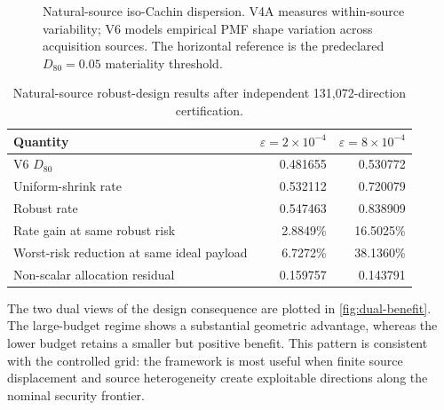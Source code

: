 \documentclass[10pt]{article}
\begin{document}
\begin{figure}[t]
\centering
{}
\caption{Natural-source iso-Cachin dispersion. V4A measures within-source variability; V6 models empirical PMF shape variation across acquisition sources. The horizontal reference is the predeclared \(D_{80}=0.05\) materiality threshold.}
\label{fig:natural-d80}
\end{figure}

\begin{table}[t]
\centering
\caption{Natural-source robust-design results after independent 131,072-direction certification.}
\label{tab:natural-results}
\small
\begin{tabular}{@{}lrr@{}}
\toprule
Quantity & \(\varepsilon=2\times10^{-4}\) & \(\varepsilon=8\times10^{-4}\)\\
\midrule
V6 \(D_{80}\) & 0.481655 & 0.530772\\
Uniform-shrink rate & 0.532112 & 0.720079\\
Robust rate & 0.547463 & 0.838909\\
Rate gain at same robust risk & 2.8849\% & 16.5025\%\\
Worst-risk reduction at same ideal payload & 6.7272\% & 38.1360\%\\
Non-scalar allocation residual & 0.159757 & 0.143791\\
\bottomrule
\end{tabular}
\end{table}

The two dual views of the design consequence are plotted in \cref{fig:dual-benefit}. The large-budget regime shows a substantial geometric advantage, whereas the lower budget retains a smaller but positive benefit. This pattern is consistent with the controlled grid: the framework is most useful when finite source displacement and source heterogeneity create exploitable directions along the nominal security frontier.
\end{document}
